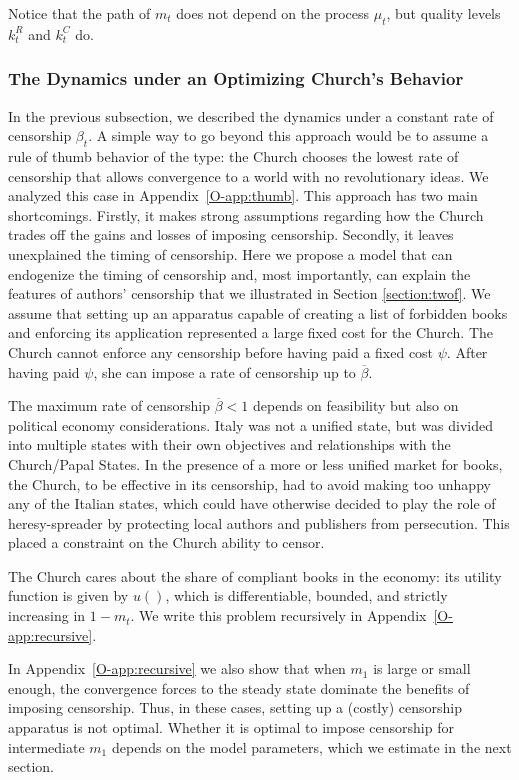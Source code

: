 Notice that the path of $m_t$ does not depend on the process $\mu_t$, but quality levels $k^R_t$ and $k^C_t$ do.


\subsubsection*{The Dynamics under an Optimizing Church's Behavior}

In the previous subsection, we described the dynamics under a constant rate of censorship $\beta_t$. A simple way to go beyond this approach would be to assume a rule of thumb behavior of the type: the Church chooses the lowest rate of censorship that allows convergence to a world with no revolutionary ideas. We analyzed this case in Appendix~\ref{O-app:thumb}.
This approach has two main shortcomings. Firstly, it makes strong assumptions regarding how the Church trades off the gains and losses of imposing censorship. Secondly, it leaves unexplained the timing of censorship. Here we propose a model that can endogenize the timing of censorship and, most importantly, can explain the  features of authors' censorship that we illustrated in Section \ref{section:twof}. We assume that setting up an apparatus capable of creating a list of forbidden books and enforcing its application represented a large fixed cost for the Church. The Church cannot enforce any censorship before having paid a fixed cost $\psi$. After having paid $\psi$, she can impose a rate of censorship up to $\overline{\beta}$.

The maximum rate of censorship $\overline{\beta}<1$ depends on feasibility but also on political economy considerations.
Italy was not a unified state, but was divided into multiple states with their own objectives and relationships with the Church/Papal States. In the presence of a more or less unified market for books, the Church, to be effective in its censorship, had to avoid making too unhappy any of the Italian states, which could have otherwise decided to play the role of heresy-spreader by protecting local authors and publishers from persecution. This placed a constraint on the Church ability to censor.

The Church cares about the share of compliant books in the economy: its utility function is given by $u()$, which is differentiable, bounded, and strictly increasing in $1-m_t$. We write this problem recursively in Appendix~\ref{O-app:recursive}.

In Appendix~\ref{O-app:recursive} we also show that when $m_1$ is large or small enough, the convergence forces to the steady state dominate the benefits of imposing censorship. Thus, in these cases, setting up a (costly) censorship apparatus is not optimal.  Whether it is optimal to impose censorship for intermediate $m_1$ depends on the model parameters, which we estimate in the next section.

